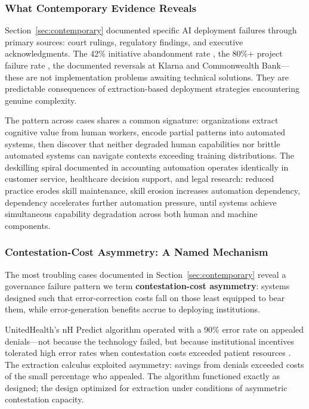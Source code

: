 \subsubsection{What Contemporary Evidence Reveals}

Section~\ref{sec:contemporary} documented specific AI deployment failures through primary sources: court rulings, regulatory findings, and executive acknowledgments. The 42\% initiative abandonment rate \citep{spglobal2025}, the 80\%+ project failure rate \citep{rand2024}, the documented reversals at Klarna and Commonwealth Bank—these are not implementation problems awaiting technical solutions. They are predictable consequences of extraction-based deployment strategies encountering genuine complexity.

The pattern across cases shares a common signature: organizations extract cognitive value from human workers, encode partial patterns into automated systems, then discover that neither degraded human capabilities nor brittle automated systems can navigate contexts exceeding training distributions. The deskilling spiral documented in accounting automation \citep{rintakahila2023} operates identically in customer service, healthcare decision support, and legal research: reduced practice erodes skill maintenance, skill erosion increases automation dependency, dependency accelerates further automation pressure, until systems achieve simultaneous capability degradation across both human and machine components.

\subsubsection{Contestation-Cost Asymmetry: A Named Mechanism}

The most troubling cases documented in Section~\ref{sec:contemporary} reveal a governance failure pattern we term \textbf{contestation-cost asymmetry}: systems designed such that error-correction costs fall on those least equipped to bear them, while error-generation benefits accrue to deploying institutions.

UnitedHealth's nH Predict algorithm operated with a 90\% error rate on appealed denials—not because the technology failed, but because institutional incentives tolerated high error rates when contestation costs exceeded patient resources \citep{cbsnews2023united}. The extraction calculus exploited asymmetry: savings from denials exceeded costs of the small percentage who appealed. The algorithm functioned exactly as designed; the design optimized for extraction under conditions of asymmetric contestation capacity.

